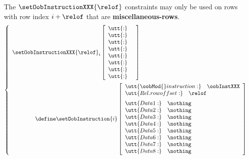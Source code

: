 \saNote{} The $\setOobInstructionXXX{\relof}$ constraints may only be used on rows with row index $i + \relof$ that are \textbf{miscellaneous-rows}.
\[
        \left\{ \begin{array}{l}
                \setOobInstructionXXX {\relof} _{i}
                \left[ \begin{array}{ll}
                        \utt{:} &  \\
                        \utt{:} &  \\
                        \utt{:} &  \\
                        \utt{:} &  \\
                        \utt{:} &  \\
                        \utt{:} &  \\
                        \utt{:} &  \\
                        \utt{:} &  \\
                \end{array} \right] \vspace{2mm} \\
                \qquad \qquad \define
                \setOobInstruction{i}
                \left[ \begin{array}{llr}
                        \multicolumn{3}{l}{\utt{\oobMod{} instruction:} \quad \oobInstXXX} \\
                        \multicolumn{3}{l}{\utt{Rel. row offset:}            \quad \relof}         \vspace{2mm} \\
                        \utt{Data 1:}          &  \nothing  \\
                        \utt{Data 2:}          &  \nothing  \\
                        \utt{Data 3:}          &  \nothing  \\
                        \utt{Data 4:}          &  \nothing  \\
                        \utt{Data 5:}          &  \nothing  \\
                        \utt{Data 6:}          &  \nothing  \\
                        \utt{Data 7:}          &  \nothing  \\
                        \utt{Data 8:}          &  \nothing  \\
                \end{array} \right] \\
        \end{array} \right.
\]
